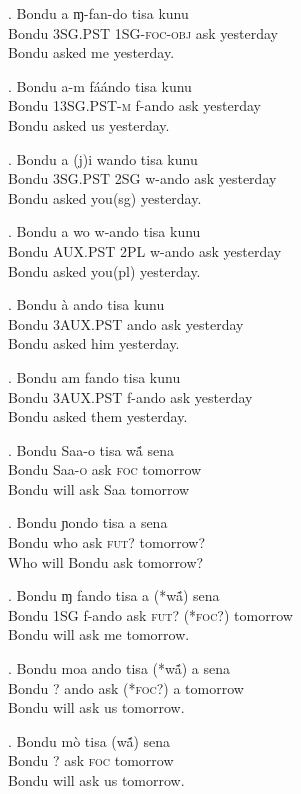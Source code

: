 \documentclass{assets/fieldnotes}
\begin{document}
\exg. Bondu a ɱ-fan-do tisa kunu\\
Bondu \textsc{3SG.PST} 1\textsc{SG}-\textsc{foc}-\textsc{obj} ask yesterday\\
Bondu asked me yesterday.

\exg. Bondu a-m fáándo tisa kunu\\
Bondu 1\textsc{3SG.PST-m} f-ando ask yesterday\\
Bondu asked us yesterday.

\exg. Bondu a (j)i wando tisa kunu\\
Bondu \textsc{3SG.PST} 2\textsc{SG} w-ando ask yesterday\\
Bondu asked you(sg) yesterday.

\exg.  Bondu a wo w-ando tisa kunu\\
Bondu \textsc{AUX.PST} 2\textsc{PL} w-ando ask yesterday\\
Bondu asked you(pl) yesterday.

\exg. Bondu à ando tisa kunu\\
Bondu 3\textsc{AUX.PST} ando ask yesterday\\
Bondu asked him yesterday.

\exg. Bondu am fando tisa kunu\\
Bondu 3\textsc{AUX.PST} f-ando ask yesterday\\
Bondu asked them yesterday. 


\exg. Bondu Saa-o tisa wã́ sena\\
Bondu Saa-\textsc{o} ask \textsc{foc} tomorrow\\
Bondu will ask Saa tomorrow

\exg. Bondu ɲondo tisa a sena\\
Bondu who ask \textsc{fut?} tomorrow?\\
Who will Bondu ask tomorrow?

\exg. Bondu ɱ fando tisa a (*wã́) sena\\
Bondu 1\textsc{SG} f-ando ask \textsc{fut?} (*\textsc{foc?})  tomorrow\\
Bondu will ask me tomorrow.

\exg. Bondu moa ando tisa (*wã́) a sena\\
Bondu ? ando ask (*\textsc{foc?}) a tomorrow\\
Bondu will ask us tomorrow.

\exg. Bondu mò tisa (wã́) sena\\
Bondu ? ask \textsc{foc} tomorrow\\
Bondu will ask us tomorrow.
\end{document}
